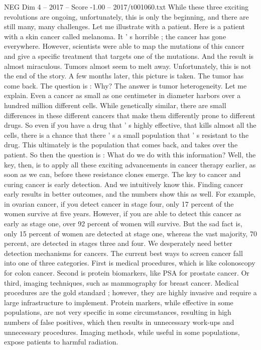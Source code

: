 \begin{textsample}{NEG Dim 4 – 2017 – Score -1.00 – 2017/t001060.txt}
While these three exciting revolutions are ongoing, unfortunately, this is only the beginning, and there are still many, many challenges.
Let me illustrate with a patient.
Here is a patient with a skin cancer called melanoma.
It ' s horrible ; the cancer has gone everywhere.
However, scientists were able to map the mutations of this cancer and give a specific treatment that targets one of the mutations.
And the result is almost miraculous.
Tumors almost seem to melt away.
Unfortunately, this is not the end of the story.
A few months later, this picture is taken.
The tumor has come back.
The question is : Why?
The answer is tumor heterogeneity.
Let me explain.
Even a cancer as small as one centimeter in diameter harbors over a hundred million different cells.
While genetically similar, there are small differences in these different cancers that make them differently prone to different drugs.
So even if you have a drug that ' s highly effective, that kills almost all the cells, there is a chance that there ' s a small population that ' s resistant to the drug.
This ultimately is the population that comes back, and takes over the patient.
So then the question is : What do we do with this information?
Well, the key, then, is to apply all these exciting advancements in cancer therapy earlier, as soon as we can, before these resistance clones emerge.
The key to cancer and curing cancer is early detection.
And we intuitively know this.
Finding cancer early results in better outcomes, and the numbers show this as well.
For example, in ovarian cancer, if you detect cancer in stage four, only 17 percent of the women survive at five years.
However, if you are able to detect this cancer as early as stage one, over 92 percent of women will survive.
But the sad fact is, only 15 percent of women are detected at stage one, whereas the vast majority, 70 percent, are detected in stages three and four.
We desperately need better detection mechanisms for cancers.
The current best ways to screen cancer fall into one of three categories.
First is medical procedures, which is like colonoscopy for colon cancer.
Second is protein biomarkers, like PSA for prostate cancer.
Or third, imaging techniques, such as mammography for breast cancer.
Medical procedures are the gold standard ; however, they are highly invasive and require a large infrastructure to implement.
Protein markers, while effective in some populations, are not very specific in some circumstances, resulting in high numbers of false positives, which then results in unnecessary work-ups and unnecessary procedures.
Imaging methods, while useful in some populations, expose patients to harmful radiation.

\end{textsample}
